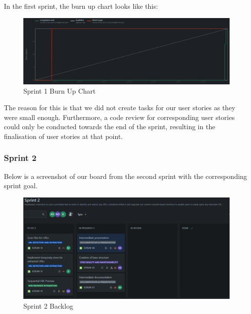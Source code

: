 In the first sprint, the burn up chart looks like this:
\begin{figure}[h!]
    \centering
    \includegraphics[width=1\textwidth]{pictures/sprint_1_burndownchart}
    \caption{Sprint 1 Burn Up Chart}
    \label{fig:sprint_1_bunrdown_chart}
\end{figure}

The reason for this is that we did not create tasks for our user stories as they were small enough.
Furthermore, a code review for corresponding user stories could only be conducted towards the end of the sprint, resulting in the finalisation of user stories at that point.
\clearpage

\subsubsection{Sprint 2}
Below is a screenshot of our board from the second sprint with the corresponding sprint goal.
\begin{figure}[h!]
    \centering
    \includegraphics[width=1\textwidth]{pictures/backlog_sprint_2}
    \caption{Sprint 2 Backlog}
    \label{fig:sprint_2_backlog}
\end{figure}

